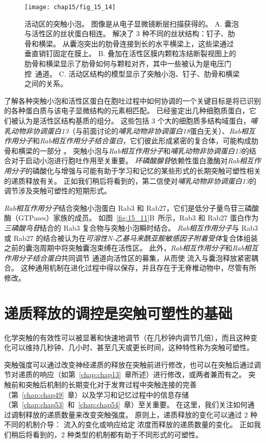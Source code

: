 \begin{figure}[htbp]
	\centering
	\texttt{[image: chap15/fig\_15\_14]}
	\caption{活动区的突触小泡。
		图像是从电子显微镜断层扫描获得的\cite{harlow2001architecture}。
		A. 囊泡与活性区的丝状蛋白相连。
		解决了 3 种不同的丝状结构：钉子、肋骨和横梁。
		从囊泡突出的肋骨连接到长的水平横梁上，这些梁通过垂直销钉固定在膜上。
		B. 叠加在活性区膜内颗粒冻结断裂视图上的肋骨和横梁显示了肋骨如何与颗粒对齐，其中一些被认为是电压门控~通道。
		C. 活动区结构的模型显示了突触小泡、钉子、肋骨和横梁之间的关系。}
	\label{fig:15_14}
\end{figure}


了解各种突触小泡和活性区蛋白在胞吐过程中如何协调的一个关键目标是将已识别的各种蛋白质与该电子显微结构的元素相匹配。
已经鉴定出几种细胞质蛋白，它们被认为是活性区结构基质的组分。
这些包括 3 个大的细胞质多结构域蛋白，\textit{哺乳动物非协调蛋白13}（与前面讨论的\textit{哺乳动物非协调蛋白18}蛋白无关）、\textit{Rab相互作用分子}和\textit{Rab相互作用分子结合蛋白}，它们彼此形成紧密的复合体，可能构成肋骨和横梁的一部分 。
突触小泡与\textit{Rab相互作用分子}和\textit{哺乳动物非协调蛋白13}的结合对于启动小泡进行胞吐作用至关重要。
\textit{环磷酸腺苷}依赖性蛋白激酶对\textit{Rab相互作用分子}的磷酸化与增强与可能有助于学习和记忆的某些形式的长期突触可塑性相关的递质释放有关。
正如我们稍后将看到的，第二信使对\textit{哺乳动物非协调蛋白13}的调节涉及突触可塑性的短期形式。


\textit{Rab相互作用分子}结合突触小泡蛋白 Rab3 和 Rab27，它们是低分子量鸟苷三磷酸酶（GTPases）家族的成员。
如图~\ref{fig:15_11}B~所示，Rab3 和 Rab27 蛋白作为\textit{三磷酸鸟苷}结合的 Rab3 复合物与突触小泡瞬时结合。
\textit{Rab相互作用分子}与 Rab3 或 Rab27 的结合被认为在\textit{可溶性N-乙基马来酰亚胺敏感因子附着受体}复合体组装之前的囊泡周期中将突触囊泡束缚在活性区。
此外，\textit{Rab相互作用分子}和\textit{Rab相互作用分子结合蛋白}共同调节  通道向活性区的募集，从而使  流入与囊泡释放紧密耦合。
这种通用机制在进化过程中得以保存，并且存在于无脊椎动物中，尽管有所修改。



\section{递质释放的调控是突触可塑性的基础}

化学突触的有效性可以被显著和快速地调节（在几秒钟内调节几倍），而且这种变化可以维持几秒钟、几小时、甚至几天或更长时间，这种特性称为突触可塑性。


突触强度可以通过改变神经递质的释放在突触前进行修改，也可以在突触后通过调节对递质的响应（如第~\ref{chap:chap13}~章所述）进行修改，或两者兼而有之。
突触前和突触后机制的长期变化对于发育过程中突触连接的完善（第~\ref{chap:chap49}~章）以及学习和记忆过程中的信息存储（第~\ref{chap:chap53}~和~\ref{chap:chap54}~章）至关重要。
在这里，我们关注如何通过调制释放的递质数量来改变突触强度。
原则上，递质释放的变化可以通过 2 种不同的机制介导：
 流入的变化或响应给定  浓度而释放的递质数量的变化。
正如我们稍后将看到的，2 种类型的机制都有助于不同形式的可塑性。


